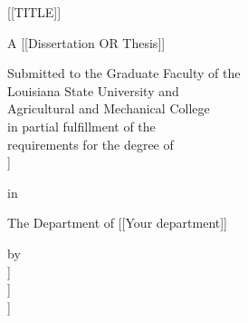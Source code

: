 
\setcounter{page}{1}
\thispagestyle{empty}

{\centering

\newcommand{\smallspace}{\vspace{6 mm}}
\newcommand{\largespace}{\vspace{68 mm}}

{\Large \uppercase{[[title]]}} \\ \largespace

A [[Dissertation OR Thesis]] \\ \smallspace

Submitted to the Graduate Faculty of the \\
Louisiana State University and \\
Agricultural and Mechanical College \\
in partial fulfillment of the \\
requirements for the degree of \\
[[Doctor of Philosophy OR Master of (degree)]] \\ \smallspace

in \\ \smallspace

The Department of [[Your department]] \\ \largespace

by \\
[[Your Name]] \\
[[Past Degrees go here along with university and year]] \\
[[Graduation month and year]] \\
}